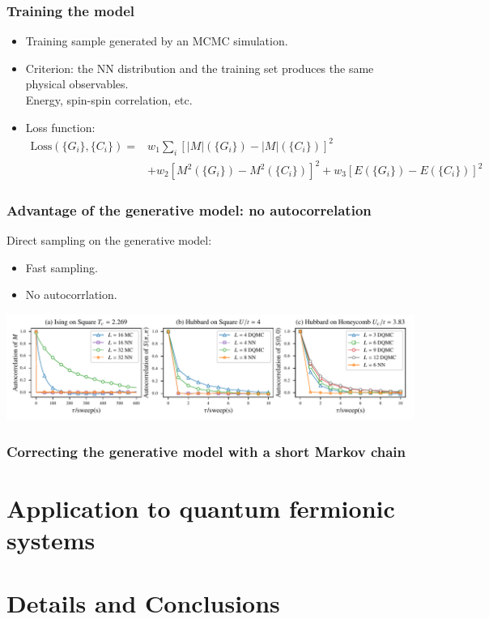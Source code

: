 \documentclass[xcolor=table, 10pt, aspectratio=169, ignorenonframetext]{beamer}
\begin{document}
\begin{frame}
  \frametitle{Training the model}
  \begin{itemize}
  \item Training sample generated by an MCMC simulation.
  \item Criterion: the NN distribution and the training set produces the same physical observables.\\
    Energy, spin-spin correlation, etc.
  \item Loss function:
    \begin{align*}
      \text{Loss}(\{G_i\},\{C_i\})=&w_1\sum_i[|M|(\{G_i\})-|M|(\{C_i\})]^2\\
      &+w_2 [M^2(\{G_i\})-M^2(\{C_i\})]^2+w_3 [E(\{G_i\})-E(\{C_i\})]^2
    \end{align*}

  \end{itemize}
\end{frame}

\begin{frame}
  \frametitle{Advantage of the generative model: no autocorrelation}
  Direct sampling on the generative model:
  \begin{itemize}
  \item Fast sampling.
  \item No autocorrlation.
  \end{itemize}
  \begin{center}
    \includegraphics{autocorr}
  \end{center}
\end{frame}

\begin{frame}
  \frametitle{Correcting the generative model with a short Markov chain}
\end{frame}
\section{Application to quantum fermionic systems}

\section{Details and Conclusions}
\end{document}
